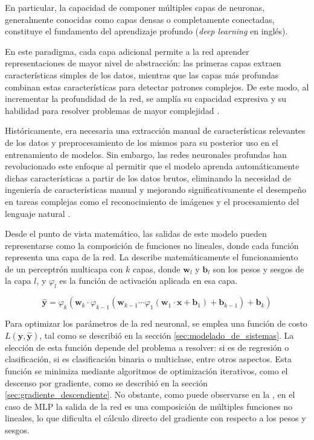 En particular, la capacidad de componer múltiples capas de neuronas, generalmente conocidas como capas densas o completamente conectadas, constituye el fundamento del aprendizaje profundo (\textit{deep learning} en inglés).

En este paradigma, cada capa adicional permite a la red aprender representaciones de mayor nivel de abstracción: las primeras capas extraen características simples de los datos, mientras que las capas más profundas combinan estas características para detectar patrones complejos. De este modo, al incrementar la profundidad de la red, se amplía su capacidad expresiva y su habilidad para resolver problemas de mayor complejidad \cite{lecun:hal-04206682}.

Históricamente, era necesaria una extracción manual de características relevantes de los datos y preprocesamiento de los mismos para su posterior uso en el entrenamiento de modelos. Sin embargo, las redes neuronales profundas han revolucionado este enfoque al permitir que el modelo aprenda automáticamente dichas características a partir de los datos brutos, eliminando la necesidad de ingeniería de características manual y mejorando significativamente el desempeño en tareas complejas como el reconocimiento de imágenes y el procesamiento del lenguaje natural \cite{Goodfellow2016}.



Desde el punto de vista matemático, las salidas de este modelo pueden representarse como la composición de funciones no lineales, donde cada función representa una capa de la red. La  describe matemáticamente el funcionamiento de un perceptrón multicapa con $k$ capas, donde $\mathbf{w}_l$ y $\mathbf{b}_l$ son los pesos y sesgos de la capa $l$, y $\varphi_l$ es la función de activación aplicada en esa capa.

\begin{equation}
    \label{eq:mlp}
    \mathbf{\hat{y}} = \varphi_k\left(\mathbf{w}_k \cdot \varphi_{k-1}\left(\mathbf{w}_{k-1} \cdots \varphi_1\left(\mathbf{w}_1 \cdot \mathbf{x} + \mathbf{b}_1\right) + \mathbf{b}_{k-1}\right) + \mathbf{b}_k\right)
\end{equation}

Para optimizar los parámetros de la red neuronal, se emplea una función de costo $L(\mathbf{y}, \hat{\mathbf{y}})$, tal como se describió en la sección \ref{sec:modelado_de_sistemas}. La elección de esta función depende del problema a resolver: si es de regresión o clasificación, si es clasificación binaria o multiclase, entre otros aspectos. Esta función se minimiza mediante algoritmos de optimización iterativos, como el descenso por gradiente, como se describió en la sección \ref{sec:gradiente_descendiente}. No obstante, como puede observarse en la , en el caso de MLP la salida de la red es una composición de múltiples funciones no lineales, lo que dificulta el cálculo directo del gradiente con respecto a los pesos y sesgos.

